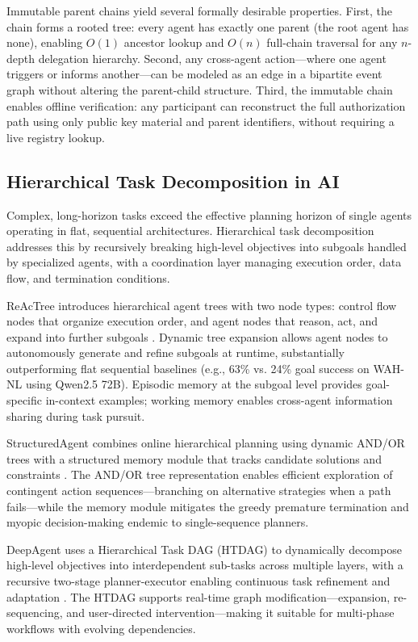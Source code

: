 Immutable parent chains yield several formally desirable properties. First, the chain forms a rooted tree: every agent has exactly one parent (the root agent has none), enabling $O(1)$ ancestor lookup and $O(n)$ full-chain traversal for any $n$-depth delegation hierarchy. Second, any cross-agent action---where one agent triggers or informs another---can be modeled as an edge in a bipartite event graph without altering the parent-child structure. Third, the immutable chain enables offline verification: any participant can reconstruct the full authorization path using only public key material and parent identifiers, without requiring a live registry lookup.

\subsection{Hierarchical Task Decomposition in AI}

Complex, long-horizon tasks exceed the effective planning horizon of single agents operating in flat, sequential architectures. Hierarchical task decomposition addresses this by recursively breaking high-level objectives into subgoals handled by specialized agents, with a coordination layer managing execution order, data flow, and termination conditions.

ReAcTree introduces hierarchical agent trees with two node types: control flow nodes that organize execution order, and agent nodes that reason, act, and expand into further subgoals \cite{reactree2025}. Dynamic tree expansion allows agent nodes to autonomously generate and refine subgoals at runtime, substantially outperforming flat sequential baselines (e.g., 63\% vs. 24\% goal success on WAH-NL using Qwen2.5 72B). Episodic memory at the subgoal level provides goal-specific in-context examples; working memory enables cross-agent information sharing during task pursuit.

StructuredAgent combines online hierarchical planning using dynamic AND/OR trees with a structured memory module that tracks candidate solutions and constraints \cite{structuredagent2025}. The AND/OR tree representation enables efficient exploration of contingent action sequences---branching on alternative strategies when a path fails---while the memory module mitigates the greedy premature termination and myopic decision-making endemic to single-sequence planners.

DeepAgent uses a Hierarchical Task DAG (HTDAG) to dynamically decompose high-level objectives into interdependent sub-tasks across multiple layers, with a recursive two-stage planner-executor enabling continuous task refinement and adaptation \cite{deepagent2025}. The HTDAG supports real-time graph modification---expansion, re-sequencing, and user-directed intervention---making it suitable for multi-phase workflows with evolving dependencies.

